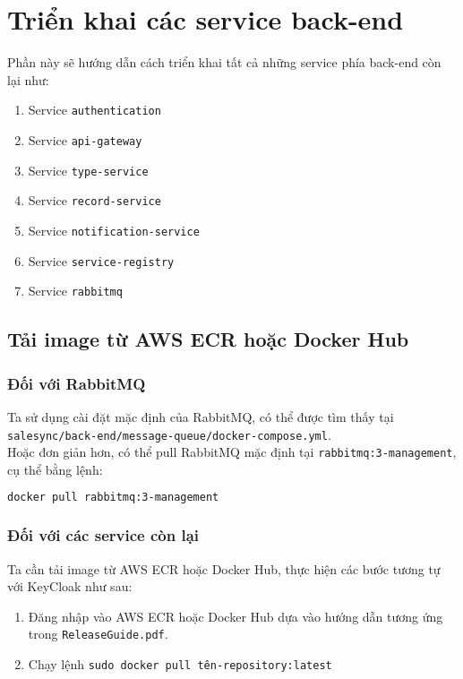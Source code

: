 \chapter{Triển khai các service back-end}
\label{Chapter3}
Phần này sẽ hướng dẫn cách triển khai tất cả những service phía back-end còn lại như:
\begin{enumerate}
    \item Service \texttt{authentication}
    \item Service \texttt{api-gateway}
    \item Service \texttt{type-service}
    \item Service \texttt{record-service}
    \item Service \texttt{notification-service}
    \item Service \texttt{service-registry}
    \item Service \texttt{rabbitmq}
\end{enumerate}

\section{Tải image từ AWS ECR hoặc Docker Hub}
\subsection{Đối với RabbitMQ}
Ta sử dụng cài đặt mặc định của RabbitMQ, có thể được tìm thấy tại \\ \texttt{salesync/back-end/message-queue/docker-compose.yml}.\\
Hoặc đơn giản hơn, có thể pull RabbitMQ mặc định tại \texttt{rabbitmq:3-management}, cụ thể bằng lệnh:
\begin{lstlisting}[language=bash]
    docker pull rabbitmq:3-management
\end{lstlisting}
\subsection{Đối với các service còn lại}
Ta cần tải image từ AWS ECR hoặc Docker Hub, thực hiện các bước tương tự với KeyCloak như sau:
\begin{enumerate}
    \item Đăng nhập vào AWS ECR hoặc Docker Hub dựa vào hướng dẫn tương ứng trong \texttt{ReleaseGuide.pdf}.
    \item Chạy lệnh \texttt{sudo docker pull tên-repository:latest}
\end{enumerate}

